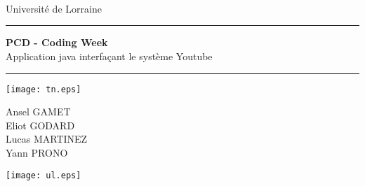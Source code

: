 \thispagestyle{empty}


\begin{flushleft}
\school\\
\schoolAddress\\
\schoolCodeAndCity\\
Université de Lorraine\\
\end{flushleft}

\vspace{0.6cm}

\begin{center}
\rule{\textwidth}{0.8pt}

\vspace{0.6cm}

\baselineskip=3pt
{\Huge \bfseries{PCD - Coding Week}}\\
\LARGE{Application java interfaçant le système Youtube}\\

\vspace{0.2cm}

\rule{\textwidth}{0.8pt}
\end{center}

\vspace{0.5cm}

	\begin{center}
		\texttt{[image: tn.eps]}
	\end{center}

	\vspace{0.5cm}
	\begin{center}
		\Large{Ansel GAMET}\\
		\Large{Eliot GODARD}\\
		\Large{Lucas MARTINEZ}\\
		\Large{Yann PRONO}
	\end{center}

	\vspace{0.5cm}
	\begin{center}
		\Large{\schoolYear}
	\end{center}

\vspace{0.5cm}
	\begin{center}
		\texttt{[image: ul.eps]}
	\end{center}